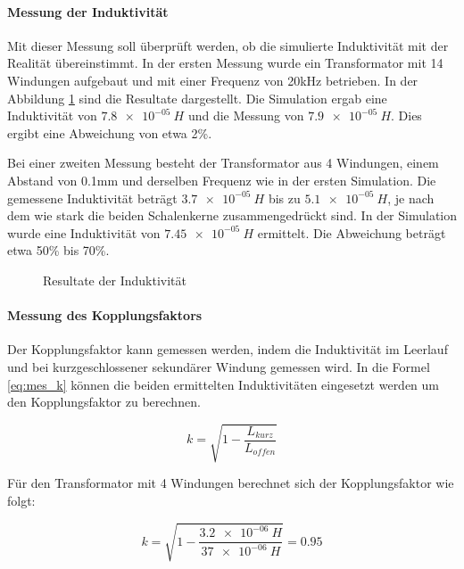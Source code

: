 \paragraph{Messung der Induktivität}
Mit dieser Messung soll überprüft werden, ob die simulierte Induktivität mit der Realität übereinstimmt. In der ersten Messung wurde ein Transformator mit 14 Windungen aufgebaut und mit einer Frequenz von 20kHz betrieben. In der Abbildung \ref{fig:mess_ind} sind die Resultate dargestellt. Die Simulation ergab eine Induktivität von $ \SI{7.8e-05}{H} $ und die Messung von $ \SI{7.9e-05}{H} $. Dies ergibt eine Abweichung von etwa 2\%. 

Bei einer zweiten Messung besteht der Transformator aus 4 Windungen, einem Abstand von 0.1mm und derselben Frequenz wie in der ersten Simulation. Die gemessene Induktivität beträgt $ \SI{3.7e-05}{H} $ bis zu $ \SI{5.1e-05}{H} $, je nach dem wie stark die beiden Schalenkerne zusammengedrückt sind. In der Simulation wurde eine Induktivität von $ \SI{7.45e-05}{H} $ ermittelt. Die Abweichung beträgt etwa 50\% bis 70\%. 

\begin{figure}[H]
	\centering
	\qquad
	\caption{Resultate der Induktivität}
	\label{fig:mess_ind}
\end{figure}

\paragraph{Messung des Kopplungsfaktors}
Der Kopplungsfaktor kann gemessen werden, indem die Induktivität im Leerlauf und bei kurzgeschlossener sekundärer Windung gemessen wird. In die Formel \ref{eq:mes_k} können die beiden ermittelten Induktivitäten eingesetzt werden um den Kopplungsfaktor zu berechnen.

\begin{equation}\label{eq:mes_k}
k = \sqrt{1-\frac{L_{kurz}}{L_{offen}}}
\end{equation}

Für den Transformator mit 4 Windungen berechnet sich der Kopplungsfaktor wie folgt:

\begin{equation}\label{eq:berechnung_k1}
k = \sqrt{1-\frac{\SI{3.2e-06}{H}}{\SI{37e-06}{H}}}=0.95
\end{equation}

